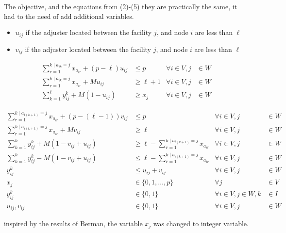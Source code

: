 \begin{frame}[allowframebreaks]
  The objective, and the equations from (2)-(5) they are practically the same,
  it had to the need of add additional variables.
  \begin{itemize}
  \item $u_{ij}$ if the adjuster located between the facility $j$, and node $i$ are less than $\ell$
  \item $v_{ij}$ if the adjuster located between the facility $j$, and node $i$ are less than $\ell$
  \end{itemize}


{\footnotesize
  \begin{align}
    \sum_{r = 1}^{k \mid a_{ik}=j}{x_{a_{ir}}} + (p-\ell) u_{ij} & \leq p & \forall i \in V, j &\in W \\
    \sum_{r = 1}^{k \mid a_{ik}=j}{x_{a_{ir}}} + M u_{ij} & \geq \ell+1   & \forall i \in V, j &\in W \\
    \sum_{k = 1}^{\ell}{y_{ij}^{k}} + M (1 - u_{ij}) & \geq x_j           & \forall i \in V, j &\in W
  \end{align}
  
  \begin{align}
    \sum_{r = 1}^{k \mid a_{i(k+1)}=j}{x_{a_{ir}}} + (p-(\ell-1)) v_{ij} & \leq p                                     & \forall i \in V, j &\in W\\
    \sum_{r = 1}^{k \mid a_{i(k+1)}=j}{x_{a_{ir}}} + M v_{ij}         & \geq \ell                                     & \forall i \in V, j &\in W\\
    \sum_{k=1}^{k}{y_{ij}^{k}} + M (1 - v_{ij} + u_{ij}) & \geq \ell - \sum_{r = 1}^{k \mid a_{i(k+1)}=j}{x_{a_{ir}}} & \forall i \in V, j &\in W\\
    \sum_{k=1}^{k}{y_{ij}^{k}} - M (1 - v_{ij} + u_{ij}) & \leq \ell - \sum_{r = 1}^{k \mid a_{i(k+1)}=j}{x_{a_{ir}}} & \forall i \in V, j &\in W\\
    y_{ij}^{k} & \leq u_{ij} + v_{ij}  &       \forall i \in V,j &\in W \\
    x_j & \in \{0,1,\ldots,p\}         &               \forall j &\in V \nonumber\\
    y_{ij}^{k} & \in \{0,1\}           & \forall i\in V,j\in W,k &\in I \nonumber\\
    u_{ij},v_{ij} & \in \{0,1\}        &       \forall i \in V,j &\in W \nonumber
  \end{align}
}
  inspired by the results of Berman, the variable $x_j$ 
  was changed to integer variable.
\end{frame}
